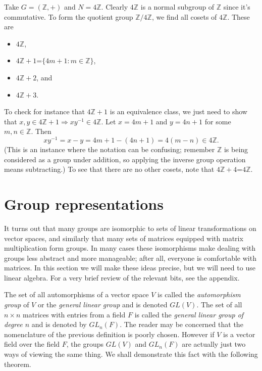 \begin{example*}{}{}
  Take $G=(\mathbb{Z},+)$ and $N=4\mathbb{Z}$. Clearly $4\mathbb{Z}$ is a
  normal subgroup of $\mathbb{Z}$ since it's commutative. To form the 
  quotient group $\mathbb{Z}/4\mathbb{Z}$, we find all cosets of $4\mathbb{Z}$.
  These are
  \begin{itemize}
    \item $4\mathbb{Z}$,
    \item $4\mathbb{Z}+1$=$\{4m+1:m\in\mathbb{Z}\}$,
    \item $4\mathbb{Z}+2$, and
    \item $4\mathbb{Z}+3$.
  \end{itemize}
  To check for instance that $4\mathbb{Z}+1$ is an equivalence class, we just
  need to show that $x,y\in4\mathbb{Z}+1\Rightarrow xy^{-1}\in4\mathbb{Z}$.
  Let $x=4m+1$ and $y=4n+1$ for some $m,n\in\mathbb{Z}$. Then
  $$xy^{-1}=x-y=4m+1-(4n+1)=4(m-n)\in4\mathbb{Z}.$$
  (This is an instance where the notation can be confusing; remember
  $\mathbb{Z}$ is being considered as a group under addition, so applying the
  inverse group operation means subtracting.) To see that there are no other
  cosets, note that $4\mathbb{Z}+4$=$4\mathbb{Z}$.
\end{example*}


\section{Group representations}

It turns out that many groups are isomorphic to sets of linear transformations
on vector spaces, and similarly that many sets of matrices equipped with matrix
multiplication form groups. In many cases these isomorphisms make dealing with
groups less abstract and more manageable; after all, everyone is comfortable
with matrices. In this section we will make these ideas precise, but we will
need to use linear algebra. For a very brief review of the relevant bits, see
the appendix.

The set of all automorphisms of a vector space $V$ is called
the {\it automorphism group} of $V$ or the 
{\it general linear group} and is
denoted $GL(V)$. The set of all $n\times n$ matrices with entries from 
a field $F$ is called the {\it general linear group of degree $n$} and 
is denoted by $GL_{n}(F)$.
The reader may be concerned that the nomenclature
of the previous definition is poorly chosen. However if $V$ is a vector field
over the field $F$, the groups $GL(V)$ and $GL_{n}(F)$ are actually just two
ways of viewing the same thing. We shall demonstrate this fact with the
following theorem. 

